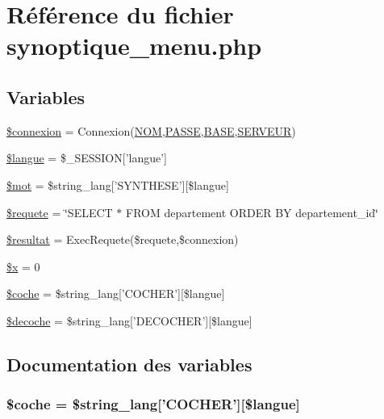 \hypertarget{synoptique__menu_8php}{
\section{R\'{e}f\'{e}rence du fichier synoptique\_\-menu.php}
\label{synoptique__menu_8php}
}
\subsection*{Variables}
\begin{CompactItemize}
\item 
\hyperlink{synoptique__menu_8php_a0}{\$connexion} = Connexion(\hyperlink{pma__connect_8php_a0}{NOM},\hyperlink{pma__connect_8php_a1}{PASSE},\hyperlink{pma__connect_8php_a3}{BASE},\hyperlink{pma__connect_8php_a2}{SERVEUR})
\item 
\hyperlink{synoptique__menu_8php_a1}{\$langue} = \$\_\-SESSION\mbox{[}'langue'\mbox{]}
\item 
\hyperlink{synoptique__menu_8php_a2}{\$mot} = \$string\_\-lang\mbox{[}'SYNTHESE'\mbox{]}\mbox{[}\$langue\mbox{]}
\item 
\hyperlink{synoptique__menu_8php_a3}{\$requete} = \char`\"{}SELECT $\ast$ FROM departement ORDER BY departement\_\-id\char`\"{}
\item 
\hyperlink{synoptique__menu_8php_a4}{\$resultat} = Exec\-Requete(\$requete,\$connexion)
\item 
\hyperlink{synoptique__menu_8php_a5}{\$x} = 0
\item 
\hyperlink{synoptique__menu_8php_a6}{\$coche} = \$string\_\-lang\mbox{[}'COCHER'\mbox{]}\mbox{[}\$langue\mbox{]}
\item 
\hyperlink{synoptique__menu_8php_a7}{\$decoche} = \$string\_\-lang\mbox{[}'DECOCHER'\mbox{]}\mbox{[}\$langue\mbox{]}
\end{CompactItemize}


\subsection{Documentation des variables}
\hypertarget{synoptique__menu_8php_a6}{
\subsubsection[\$coche]{\setlength{\rightskip}{0pt plus 5cm}\$coche = \$string\_\-lang\mbox{[}'COCHER'\mbox{]}\mbox{[}\$langue\mbox{]}}}
\label{synoptique__menu_8php_a6}


